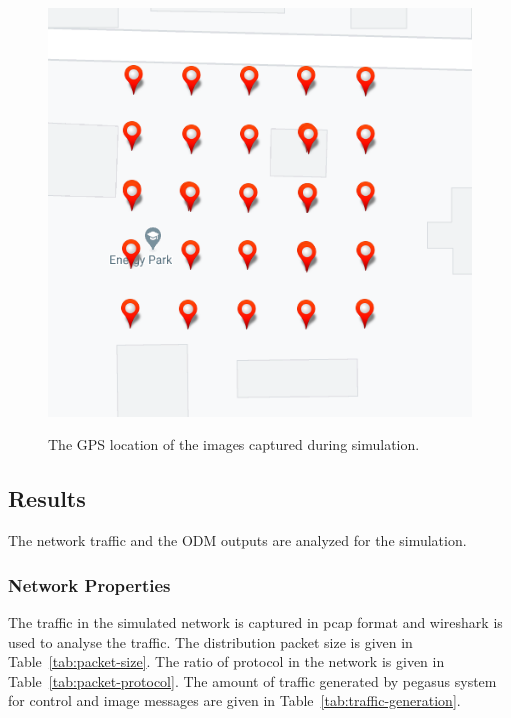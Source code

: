 \begin{figure}
	\centering
	\caption[The GPS location of the images captured during simulation.]{\small The GPS location of the images captured during simulation.} 
	\includegraphics[width=5in]{figures/experiment/simulated-image-position}
	\label{fig:simulated-images-position}
\end{figure}

\subsection{Results}
The network traffic and the ODM outputs are analyzed for the simulation.

\subsubsection{Network Properties}
The traffic in the simulated network is captured in pcap format and wireshark is used to analyse the traffic. The distribution packet size is given in Table~\ref{tab:packet-size}. The ratio of protocol in the network is given in Table~\ref{tab:packet-protocol}. The amount of traffic generated by pegasus system for control and image messages are given in Table~\ref{tab:traffic-generation}.

